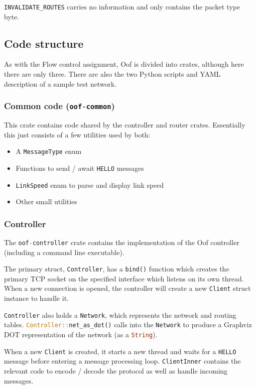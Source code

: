 \documentclass[a4paper]{article}
\numberwithin{figure}{section}
\numberwithin{table}{section}
\newcommand{\mi}{\mintinline}
\begin{document}
\mi{c}{INVALIDATE_ROUTES} carries no information and only contains the packet type byte.

\subsection{Code structure}
As with the Flow control assignment, Oof is divided into crates, although here there are only three. There are also the two Python scripts and YAML description of a sample test network.

\subsubsection{Common code (\mi{c}{oof-common})}
This crate contains code shared by the controller and router crates. Essentially this just consists of a few utilities used by both:
\begin{itemize}
	\item A \mi{rust}{MessageType} enum
	\item Functions to send / await \mi{c}{HELLO} messages
	\item \mi{rust}{LinkSpeed} enum to parse and display link speed
	\item Other small utilities
\end{itemize}

\subsubsection{Controller}
The \mi{c}{oof-controller} crate contains the implementation of the Oof controller (including a command line executable).

The primary struct, \mi{rust}{Controller}, has a \mi{rust}{bind()} function which creates the primary TCP socket on the specified interface which listens on its own thread. When a new connection is opened, the controller will create a new \mi{rust}{Client} struct instance to handle it.

\mi{rust}{Controller} also holds a \mi{rust}{Network}, which represents the network and routing tables. \mi{rust}{Controller::net_as_dot()} calls into the \mi{rust}{Network} to produce a Graphviz DOT representation of the network (as a \mi{rust}{String}).

When a new \mi{rust}{Client} is created, it starts a new thread and waits for a \mi{c}{HELLO} message before entering a message processing loop. \mi{rust}{ClientInner} contains the relevant code to encode / decode the protocol as well as handle incoming messages.
\end{document}
